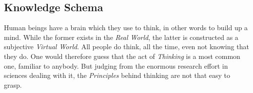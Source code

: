 %
%
%
%
%
%
%

\subsection{Knowledge Schema}
\label{knowledge_schema_heading}

Human beings have a brain which they use to think, in other words to build up a
mind. While the former exists in the \emph{Real World}, the latter is
constructed as a subjective \emph{Virtual World}. All people do think, all the
time, even not knowing that they do. One would therefore guess that the act of
\emph{Thinking} is a most common one, familiar to anybody. But judging from the
enormous research effort in sciences dealing with it, the \emph{Principles}
behind thinking are not that easy to grasp.



